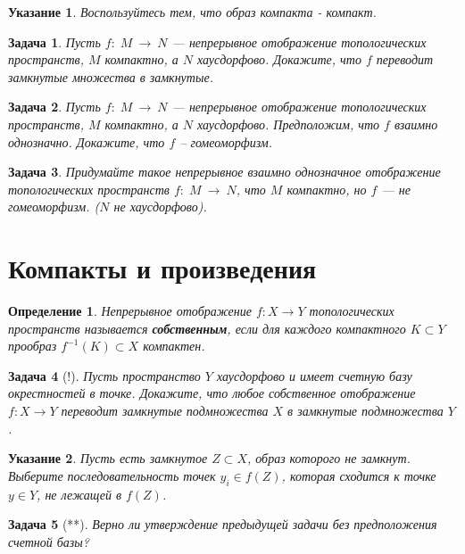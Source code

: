 \documentclass[12pt]{book}
\newcommand{\subs}{\section}
\newcommand{\arrow}{{\:\longrightarrow\:}}
\theoremstyle{upshape}
\newtheorem{zadacha}{Задача}[chapter]
\theoremstyle{generic}
\newtheorem{opredelenie}[teorema]{Определение}
\theoremstyle{upshapenonumber}
\newtheorem{ukazanie}{Указание}[section]
\newcommand{\следствие}{%
     \refstepcounter{teorema}
     {\noindent\bf Следствие \thechapter.\arabic{teorema}:\ }}
\newcommand{\пример}{%
     \refstepcounter{teorema}
     {\noindent\bf Пример \thechapter.\arabic{teorema}:\ }}
\newcommand{\лемма}{%
     \refstepcounter{teorema}
     {\noindent\bf Лемма \thechapter.\arabic{teorema}:\ }}
\newcommand{\теорема}{%
     \refstepcounter{teorema}
     {\noindent\bf Теорема \thechapter.\arabic{teorema}:\ }}
\newcommand{\утверждение}{%
     \refstepcounter{teorema}
     {\noindent\bf Утверждение \thechapter.\arabic{teorema}:\ }}
\begin{document}
{\begin{ukazanie}
Воспользуйтесь тем, что образ компакта - компакт.
\end{ukazanie}

\begin{zadacha} 
Пусть $f:\; M \arrow N$ --- непрерывное отображение
топологических пространств, $M$ компактно,
а $N$ хаусдорфово. Докажите, что 
$f$ переводит замкнутые множества
в замкнутые.
\end{zadacha}

\begin{zadacha} 
Пусть $f:\; M \arrow N$ --- непрерывное отображение
топологических пространств, $M$ компактно,
а $N$ хаусдорфово. Предположим, что $f$
взаимно однозначно. Докажите, что $f$ --
гомеоморфизм.
\end{zadacha}

\begin{zadacha} 
Придумайте такое непрерывное взаимно однозначное
отображение топологических пространств 
$f:\; M \arrow N$, что $M$
компактно, но $f$ --- не гомеоморфизм.
($N$ не хаусдорфово).
\end{zadacha}

\subs{Компакты и произведения}

\begin{opredelenie}
Непрерывное отображение $f:X \to Y$ топологических пространств называется
{\bf собственным}, если для каждого компактного $K \subset Y$ прообраз
$f^{-1}(K) \subset X$ компактен.
\end{opredelenie}

\begin{zadacha}[!]
Пусть пространство $Y$ хаусдорфово и имеет счетную базу
  окрестностей в точке. Докажите, 
что любое собственное отображение $f:X \to Y$ переводит замкнутые 
подмножества $X$ в замкнутые подмножества $Y$.
\end{zadacha}

\begin{ukazanie}
Пусть есть замкнутое $Z \subset X$, образ которого не замкнут. Выберите
последовательность точек $y_i \in f(Z)$, которая сходится к точке
$y \in Y$, не лежащей в $f(Z)$.
\end{ukazanie}

\begin{zadacha}[**]
Верно ли утверждение предыдущей задачи без предположения счетной базы?
\end{zadacha}


}
\end{document}
